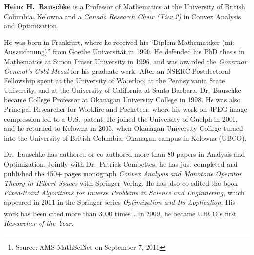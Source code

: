 \documentclass{article}        %
\begin{document}
\textbf{Heinz H.\ Bauschke}
is a Professor of Mathematics
at the University of British Columbia, Kelowna and
a \emph{Canada Research Chair (Tier 2)} in
Convex Analysis and Optimization.

He was born in Frankfurt, where
he received his ``Diplom-Mathematiker (mit Auszeichnung)''
from Goethe Universit\"at  in 1990.
He defended his PhD thesis in Mathematics at Simon Fraser University
in 1996, and was awarded the \emph{Governor General's Gold Medal}
for his graduate work.
After an NSERC Postdoctoral Fellowship spent
at the University of Waterloo, at the Pennsylvania State University,
and at the University of California at Santa Barbara,
Dr.~Bauschke
became College Professor at Okanagan University College in 1998.
He was also Principal Researcher for Workfire and Packeteer, where
his work on JPEG image compression led to a U.S.~patent.
He joined the University of Guelph in 2001, and he returned
to Kelowna in 2005, when Okanagan University College turned
into the University of British Columbia, Okanagan campus in Kelowna
(UBCO).

Dr.\ Bauschke has authored or co-authored more than 80 papers in
Analysis and Optimization.
Jointly with Dr.\ Patrick Combettes, he has just completed and
published the 450+ pages monograph \emph{Convex Analysis and Monotone
Operator Theory in Hilbert Spaces} with Springer Verlag.
He has also co-edited the book
\emph{Fixed-Point Algorithms for Inverse Problems in Science
and Enginnering}, which appeared in 2011 in the
Springer series \emph{Optimization and Its Application}.
His work has been cited more than 3000 times\footnote{Source:
AMS MathSciNet on September 7, 2011}.
In 2009, he became UBCO's first \emph{Researcher of the Year}.
\end{document}
